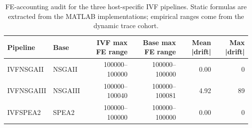 \begin{table}[t]
\centering
\caption{FE-accounting audit for the three host-specific IVF pipelines. Static formulas are extracted from the MATLAB implementations; empirical ranges come from the dynamic trace cohort.}
\label{tab:hosts_fe_audit}
\scriptsize
\begin{tabular}{llrrrr}
\toprule
Pipeline & Base & IVF max FE range & Base max FE range & Mean |drift| & Max |drift| \\
\midrule
IVFNSGAII & NSGAII & 100000--100000 & 100000--100000 & 0.00 & 0 \\
IVFNSGAIII & NSGAIII & 100000--100040 & 100000--100081 & 4.92 & 89 \\
IVFSPEA2 & SPEA2 & 100000--100000 & 100000--100000 & 0.00 & 0 \\
\bottomrule
\end{tabular}
\end{table}
